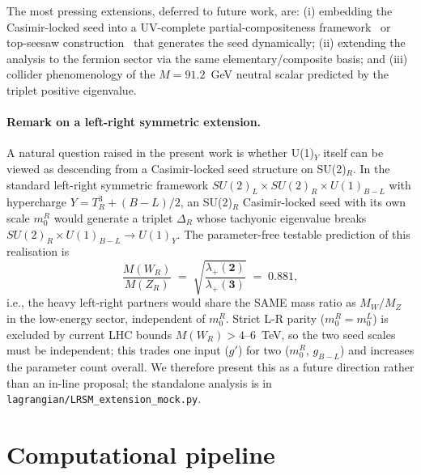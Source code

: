 \documentclass[11pt,a4paper]{article}
\newcommand{\md}{\mathbf{2}}
\newcommand{\mt}{\mathbf{3}}
\begin{document}
The most pressing extensions, deferred to future work, are: (i) embedding
the Casimir-locked seed into a UV-complete partial-compositeness
framework~\cite{Caracciolo2012} or top-seesaw
construction~\cite{Chivukula1998} that generates the seed dynamically;
(ii) extending the analysis to the fermion sector via the same
elementary/composite basis; and (iii) collider phenomenology of the
$M = 91.2$~GeV neutral scalar predicted by the triplet positive
eigenvalue.

\paragraph{Remark on a left-right symmetric extension.} A natural
question raised in the present work is whether U(1)$_Y$ itself can be
viewed as descending from a Casimir-locked seed structure on SU(2)$_R$.
In the standard left-right symmetric framework
$SU(2)_L \times SU(2)_R \times U(1)_{B-L}$ with hypercharge
$Y = T^3_R + (B-L)/2$, an SU(2)$_R$ Casimir-locked seed with its own
scale $m_0^R$ would generate a triplet $\Delta_R$ whose tachyonic
eigenvalue breaks $SU(2)_R \times U(1)_{B-L} \to U(1)_Y$. The
parameter-free testable prediction of this realisation is
\begin{equation}
  \frac{M(W_R)}{M(Z_R)} \;=\; \sqrt{\frac{\lambda_+(\md)}{\lambda_+(\mt)}} \;=\; 0.881,
\end{equation}
i.e., the heavy left-right partners would share the SAME mass ratio
as $M_W/M_Z$ in the low-energy sector, independent of $m_0^R$. Strict
L-R parity ($m_0^R = m_0^L$) is excluded by current LHC bounds
$M(W_R) > 4$--$6$~TeV, so the two seed scales must be independent;
this trades one input ($g'$) for two ($m_0^R$, $g_{B-L}$) and increases
the parameter count overall. We therefore present this as a future
direction rather than an in-line proposal; the standalone analysis is
in \texttt{lagrangian/LRSM\_extension\_mock.py}.

\section*{Computational pipeline}
\end{document}
